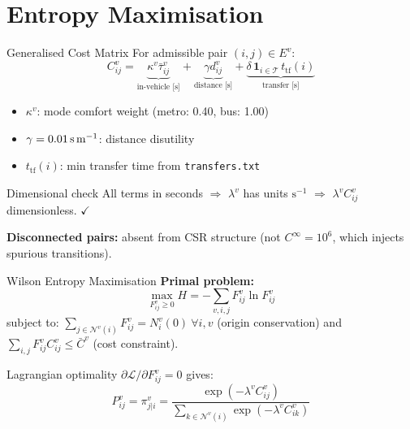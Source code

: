 \documentclass[aspectratio=169,12pt]{beamer}
\begin{document}
\section{Entropy Maximisation}
\begin{frame}{Generalised Cost Matrix}
For admissible pair $(i,j)\in E^v$:
\[
C^v_{ij} =
\underbrace{\kappa^v \bar\tau^v_{ij}}_{\text{in-vehicle [s]}}
+\underbrace{\gamma d^v_{ij}}_{\text{distance [s]}}
+\underbrace{\delta\,\mathbf{1}_{i\in\mathcal{T}}\,t_{\mathrm{tf}}(i)}_{\text{transfer [s]}}
\]
\begin{itemize}
  \item $\kappa^v$: mode comfort weight (metro: 0.40, bus: 1.00)
  \item $\gamma = 0.01\,\text{s\,m}^{-1}$: distance disutility
  \item $t_{\mathrm{tf}}(i)$: min transfer time from \texttt{transfers.txt}
\end{itemize}

\begin{exampleblock}{Dimensional check}
All terms in seconds $\Rightarrow$ $\lambda^v$ has units $\text{s}^{-1}$
$\Rightarrow$ $\lambda^v C^v_{ij}$ dimensionless. $\checkmark$
\end{exampleblock}

\vspace{4pt}
\textbf{Disconnected pairs:} absent from CSR structure
(not $C^\infty=10^6$, which injects spurious transitions).
\end{frame}

\begin{frame}{Wilson Entropy Maximisation}
\textbf{Primal problem:}
\[
\max_{F^v_{ij}\ge0} H = -\sum_{v,i,j} F^v_{ij}\ln F^v_{ij}
\]
subject to:
$\sum_{j\in\mathcal{N}^v(i)} F^v_{ij} = N^v_i(0)\ \forall i,v$ (origin conservation)
and $\sum_{i,j} F^v_{ij}C^v_{ij}\le\bar C^v$ (cost constraint).

\vspace{6pt}
Lagrangian optimality $\partial\mathcal{L}/\partial F^v_{ij}=0$ gives:
\[
P^v_{ij} = \pi^v_{j|i} =
\frac{\exp(-\lambda^v C^v_{ij})}
     {\sum_{k\in\mathcal{N}^v(i)}\exp(-\lambda^v C^v_{ik})}
\]

\begin{center}
\end{center}
\end{frame}
\end{document}
